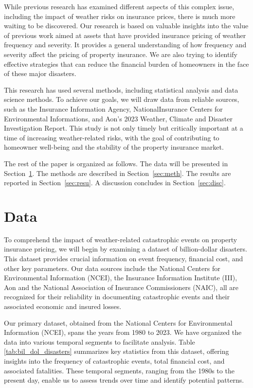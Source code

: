 \documentclass[12pt]{article}
\begin{document}
While previous research has examined different aspects of this complex issue, including the impact of weather risks on insurance 
prices, there is much more waiting to be discovered. Our research is based on valuable insights into the value of previous work 
\citep{hurricaneco} aimed at assets that have provided insurance pricing of weather frequency and severity. It provides a general 
understanding of how frequency and severity affect the pricing of property insurance. We are also trying to identify effective 
strategies that can reduce the financial burden of homeowners in the face of these major disasters.


This research has used several methods, including statistical analysis and data science methods. To achieve our goals, we will draw 
data from reliable sources, such as the Insurance Information Agency, NationalInsurance Centers for Environmental Informations, and Aon's 2023 
Weather, Climate and Disaster Investigation Report. This study is not only timely but critically important at a time of increasing 
weather-related risks, with the goal of contributing to homeowner well-being and the stability of the property insurance market.

The rest of the paper is organized as follows.
The data will be presented in Section~\ref{sec:data}.
The methods are described in Section~\ref{sec:meth}.
The results are reported in Section~\ref{sec:resu}.
A discussion concludes in Section~\ref{sec:disc}.


\section{Data}
\label{sec:data}
To comprehend the impact of weather-related catastrophic events on property insurance pricing, we will begin by examining a dataset of 
billion-dollar disasters. This dataset provides crucial information on event frequency, financial cost, and other key parameters. Our 
data sources include the National Centers for Environmental Information (NCEI)\citep{ncei}, the Insurance Information Institute 
(III)\citep{iii}, Aon\citep{aon} and the National Association of Insurance Commissioners (NAIC)\citep{naic}, all are recognized for their 
reliability in documenting catastrophic events and their associated economic and insured losses.

Our primary dataset, obtained from the National Centers for Environmental Information (NCEI)\citep{ncei}, spans the years from 1980 to 
2023. We have organized the data into various temporal segments to facilitate analysis. Table \ref{tab:bil_dol_disasters} 
summarizes key statistics from this dataset, offering insights into the frequency of catastrophic events, total financial cost, and 
associated fatalities. These temporal segments, ranging from the 1980s to the present day, enable us to assess trends over time and 
identify potential patterns.
\end{document}
